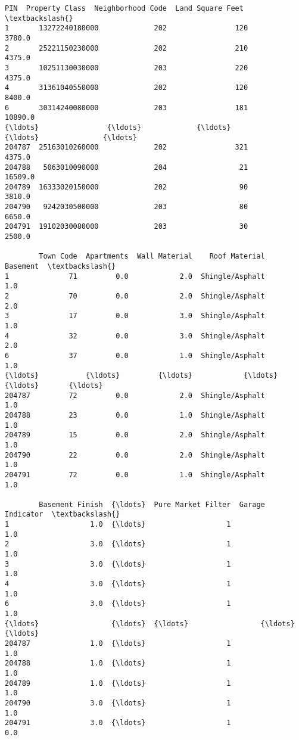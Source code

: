 \documentclass[11pt]{article}
\makeatletter
\newcommand{\boxspacing}{\kern\kvtcb@left@rule\kern\kvtcb@boxsep}
\newcommand{\prompt}[4]{
        {\ttfamily\llap{{\color{#2}[#3]:\hspace{3pt}#4}}\vspace{-\baselineskip}}
    }
\makeatother
\begin{document}
            \begin{tcolorbox}[breakable, size=fbox, boxrule=.5pt, pad at break*=1mm, opacityfill=0]
\prompt{Out}{outcolor}{41}{\boxspacing}
\begin{Verbatim}[commandchars=\\\{\}]
                   PIN  Property Class  Neighborhood Code  Land Square Feet  \textbackslash{}
1       13272240180000             202                120            3780.0
2       25221150230000             202                210            4375.0
3       10251130030000             203                220            4375.0
4       31361040550000             202                120            8400.0
6       30314240080000             203                181           10890.0
{\ldots}                {\ldots}             {\ldots}                {\ldots}               {\ldots}
204787  25163010260000             202                321            4375.0
204788   5063010090000             204                 21           16509.0
204789  16333020150000             202                 90            3810.0
204790   9242030500000             203                 80            6650.0
204791  19102030080000             203                 30            2500.0

        Town Code  Apartments  Wall Material    Roof Material  Basement  \textbackslash{}
1              71         0.0            2.0  Shingle/Asphalt       1.0
2              70         0.0            2.0  Shingle/Asphalt       2.0
3              17         0.0            3.0  Shingle/Asphalt       1.0
4              32         0.0            3.0  Shingle/Asphalt       2.0
6              37         0.0            1.0  Shingle/Asphalt       1.0
{\ldots}           {\ldots}         {\ldots}            {\ldots}              {\ldots}       {\ldots}
204787         72         0.0            2.0  Shingle/Asphalt       1.0
204788         23         0.0            1.0  Shingle/Asphalt       1.0
204789         15         0.0            2.0  Shingle/Asphalt       1.0
204790         22         0.0            2.0  Shingle/Asphalt       1.0
204791         72         0.0            1.0  Shingle/Asphalt       1.0

        Basement Finish  {\ldots}  Pure Market Filter  Garage Indicator  \textbackslash{}
1                   1.0  {\ldots}                   1               1.0
2                   3.0  {\ldots}                   1               1.0
3                   3.0  {\ldots}                   1               1.0
4                   3.0  {\ldots}                   1               1.0
6                   3.0  {\ldots}                   1               1.0
{\ldots}                 {\ldots}  {\ldots}                 {\ldots}               {\ldots}
204787              1.0  {\ldots}                   1               1.0
204788              1.0  {\ldots}                   1               1.0
204789              1.0  {\ldots}                   1               1.0
204790              3.0  {\ldots}                   1               1.0
204791              3.0  {\ldots}                   1               0.0


\end{Verbatim}
\end{tcolorbox}
\end{document}
